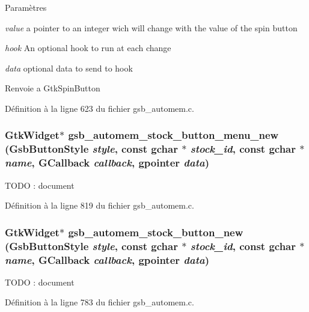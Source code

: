 \begin{DoxyParams}{Paramètres}
\item[{\em value}]a pointer to an integer wich will change with the value of the spin button \item[{\em hook}]An optional hook to run at each change \item[{\em data}]optional data to send to hook\end{DoxyParams}
\begin{DoxyReturn}{Renvoie}
a GtkSpinButton 
\end{DoxyReturn}


Définition à la ligne 623 du fichier gsb\_\-automem.c.

\subsubsection[{gsb\_\-automem\_\-stock\_\-button\_\-menu\_\-new}]{\setlength{\rightskip}{0pt plus 5cm}GtkWidget$\ast$ gsb\_\-automem\_\-stock\_\-button\_\-menu\_\-new ({\bf GsbButtonStyle} {\em style}, \/  const gchar $\ast$ {\em stock\_\-id}, \/  const gchar $\ast$ {\em name}, \/  GCallback {\em callback}, \/  gpointer {\em data})}\label{gsb__automem_8h_a6ebc5987eec7719501e978c858003c59}
TODO : document 

Définition à la ligne 819 du fichier gsb\_\-automem.c.

\subsubsection[{gsb\_\-automem\_\-stock\_\-button\_\-new}]{\setlength{\rightskip}{0pt plus 5cm}GtkWidget$\ast$ gsb\_\-automem\_\-stock\_\-button\_\-new ({\bf GsbButtonStyle} {\em style}, \/  const gchar $\ast$ {\em stock\_\-id}, \/  const gchar $\ast$ {\em name}, \/  GCallback {\em callback}, \/  gpointer {\em data})}\label{gsb__automem_8h_a0f0fe2dcf0623f752de1213dd10295f3}
TODO : document 

Définition à la ligne 783 du fichier gsb\_\-automem.c.

